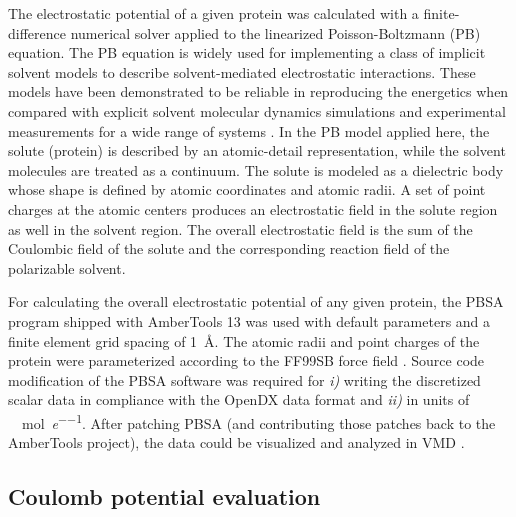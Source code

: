 The electrostatic potential of a given protein was calculated with a
finite-difference numerical solver applied to the linearized Poisson-Boltzmann
(PB) equation. The PB equation is widely used for implementing a class of
implicit solvent models to describe solvent-mediated electrostatic interactions.
These models have been demonstrated to be reliable in reproducing the energetics
when compared with explicit solvent molecular dynamics simulations and
experimental measurements for a wide range of systems \cite{honig_estatic_1995}.
In the PB model applied here, the solute (protein) is described by an
atomic-detail representation, while the solvent molecules are treated as a
continuum. The solute is modeled as a dielectric body whose shape is defined by
atomic coordinates and atomic radii. A set of point charges at the atomic
centers produces an electrostatic field in the solute region as well in the
solvent region. The overall electrostatic field is the sum of the Coulombic
field of the solute and the corresponding reaction field of the polarizable
solvent.

For calculating the overall electrostatic potential of any given protein, the
PBSA program shipped with AmberTools 13 \cite{case_amber_12} was used with
default parameters and a finite element grid spacing of \SI{1}{\angstrom}. The
atomic radii and point charges of the protein were parameterized according to
the FF99SB force field \cite{case_amber_12}. Source code modification of the
PBSA software was required for \textit{i)} writing the discretized scalar data
in compliance with the OpenDX data format \cite{opendx} and \textit{ii)} in
units of \si{\kilo\calory\per\mole\per\elementarycharge}. After patching PBSA
(and contributing those patches back to the AmberTools project), the data could
be visualized and analyzed in VMD \cite{vmd_1996}.


\subsection{Coulomb potential evaluation}

